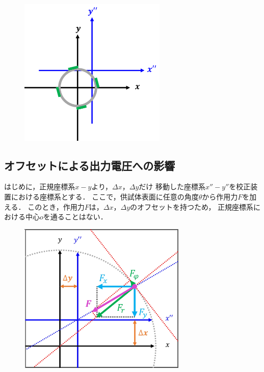 \documentclass[twocolumn,a4j]{jsarticle}
\begin{document}
\begin{figure}[htbp]
    \footnotesize
    \begin{center}
        \includegraphics[width=70mm]{../images/image_5.png}
        \caption{}
    \end{center}
\end{figure}

\newpage

\subsection{オフセットによる出力電圧への影響}

はじめに，正規座標系$x-y$より，$\Delta x$，$\Delta y$だけ
移動した座標系$x''-y''$を校正装置における座標系とする．
ここで，供試体表面に任意の角度$\theta$から作用力$F$を加える．
このとき，作用力$F$は，$\Delta x$，$\Delta y$のオフセットを持つため，
正規座標系における中心$o$を通ることはない．

\begin{figure}[htbp]
    \footnotesize
    \begin{center}
        \includegraphics[width=80mm]{../images/image_6.png}
        \caption{}
    \end{center}
\end{figure}
\end{document}
